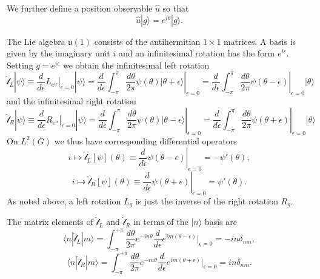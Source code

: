 \documentclass[12pt]{amsart}
\def\lauone{\mathfrak{u}(1)}
\theoremstyle{definition}
\theoremstyle{remark}
\numberwithin{equation}{section}
\begin{document}
We further define a position observable $\widehat{u}$ so that
\begin{equation}
  \widehat{u}|g\rangle = e^{i\theta} |g\rangle.
\end{equation}

The Lie algebra $\lauone$ consists of the antihermitian $1 \times 1$ matrices.
A basis is given by the imaginary unit $i$ and an infinitesimal rotation has the 
form $e^{i\epsilon}$. Setting $g = e^{i\epsilon}$ we obtain the 
infinitesimal left rotation
\begin{equation}
  \widehat{\mathcal{l}}_L |\psi\rangle \equiv \frac{d}{d\epsilon} \left. L_{e^{i\epsilon}} \right|_{\epsilon = 0} |\psi\rangle
    = \frac{d}{d\epsilon} \int_{-\pi}^{\pi} \left. \frac{d\theta}{2\pi} \psi(\theta) |\theta + \epsilon\rangle \right|_{\epsilon = 0}
    = \frac{d}{d\epsilon} \int_{-\pi}^{\pi} \left. \frac{d\theta}{2\pi} \psi(\theta - \epsilon) \right|_{\epsilon = 0} |\theta\rangle
\end{equation}
and the infinitesimal right rotation
\begin{equation}
  \widehat{\mathcal{l}}_R |\psi\rangle \equiv \frac{d}{d\epsilon} \left. R_{e^{i\epsilon}} \right|_{\epsilon = 0} |\psi\rangle
    = \frac{d}{d\epsilon} \left. \int_{-\pi}^{\pi} \frac{d\theta}{2\pi} \psi(\theta) |\theta - \epsilon\rangle \right|_{\epsilon = 0}
    = \frac{d}{d\epsilon} \left. \int_{-\pi}^{\pi} \frac{d\theta}{2\pi} \psi(\theta + \epsilon) \right|_{\epsilon = 0} |\theta\rangle
\end{equation}
On $L^2(G)$ we thus have corresponding differential operators
\begin{equation}
  i \mapsto \widehat{\mathcal{l}}_L[\psi](\theta) \equiv \left. \frac{d}{d\epsilon} \psi(\theta - \epsilon) \right|_{\epsilon = 0}
    = - \psi'(\theta),
\end{equation}
\begin{equation}
  i \mapsto \widehat{\mathcal{l}}_R[\psi](\theta) \equiv \left. \frac{d}{d\epsilon} \psi(\theta + \epsilon) \right|_{\epsilon = 0}
    = \psi'(\theta).
\end{equation}
As noted above, a left rotation $L_g$ is just the inverse
of the right rotation $R_g$.

The matrix elements of $\widehat{\mathcal{l}}_L$ and $\widehat{\mathcal{l}}_R$
in terms of the $|n\rangle$ basis are
\begin{equation}
  \langle n|\widehat{\mathcal{l}}_L |m\rangle = \int_{-\pi}^{+\pi} \frac{d\theta}{2\pi}
    e^{-in\theta} \frac{d}{d\epsilon} e^{im(\theta - \epsilon)} \bigg|_{\epsilon = 0}
    = -in\delta_{nm},
\end{equation}
\begin{equation}
  \langle n|\widehat{\mathcal{l}}_R |m\rangle = \int_{-\pi}^{+\pi} \frac{d\theta}{2\pi}
    e^{-in\theta} \frac{d}{d\epsilon} e^{im(\theta + \epsilon)} \bigg|_{\epsilon = 0}
    = in\delta_{nm}.
\end{equation}
\end{document}
